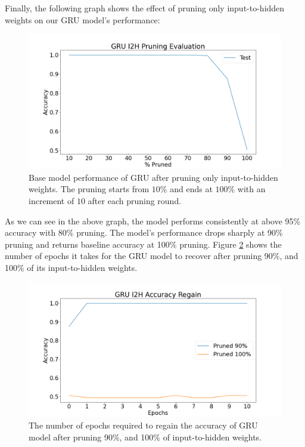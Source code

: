 Finally, the following graph shows the effect of pruning only input-to-hidden weights on our GRU model's performance:

\begin{figure}[h]
	\centering
	\includegraphics[width=0.8\linewidth]{images/results/pruning_i2h/gru_i2h_pruning_evaluation.png}
	\caption[GRU base model performance after pruning i2h weights]%
	{Base model performance of GRU after pruning only input-to-hidden weights. The pruning starts from $10\%$ and ends at $100\%$ with an increment of $10$ after each pruning round.}
	\label{fig:gru_i2h_prune}
\end{figure}

As we can see in the above graph, the model performs consistently at above 95\% accuracy with 80\% pruning. The model's performance drops sharply at 90\% pruning and returns baseline accuracy at 100\% pruning. Figure \ref{fig:gru_i2h_prune_regain} shows the number of epochs it takes for the GRU model to recover after pruning 90\%, and 100\% of its input-to-hidden weights.

\begin{figure}[h]
	\centering
	\includegraphics[width=0.8\linewidth]{images/results/pruning_i2h/gru_i2h_accuracy_regain.png}
	\caption[GRU base model performance regain after pruning i2h weights]%
	{The number of epochs required to regain the accuracy of GRU model after pruning 90\%, and 100\% of input-to-hidden weights.}
	\label{fig:gru_i2h_prune_regain}
\end{figure}

